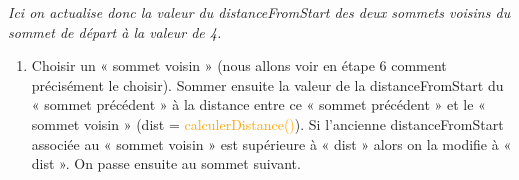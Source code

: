 \documentclass[,french]{article}
\providecommand{\tightlist}{%
  \setlength{\itemsep}{0pt}\setlength{\parskip}{0pt}}
\begin{document}
\begin{center}
\end{center}
\begin{adjustwidth}{50pt}{50pt}
\begin{center}
\emph{Ici on actualise donc la valeur du distanceFromStart des deux sommets voisins du sommet de départ à la valeur de 4.}

\end{center}

\end{adjustwidth}

\begin{enumerate}
\def\labelenumi{\arabic{enumi}.}
\setcounter{enumi}{3}
\tightlist
\item
  Choisir un « sommet voisin » (nous allons voir en étape 6 comment
  précisément le choisir). Sommer ensuite la valeur de la
  distanceFromStart du « sommet précédent » à la distance entre ce «
  sommet précédent » et le « sommet voisin » (dist =
  \textcolor{orange}{calculerDistance()}). Si l'ancienne
  distanceFromStart associée au « sommet voisin » est supérieure à «
  dist » alors on la modifie à « dist ». On passe ensuite au sommet
  suivant.
\end{enumerate}
\end{document}
